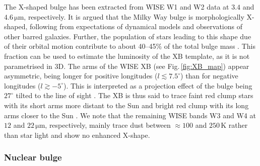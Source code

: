 \documentclass[doublespace,nopageskip]{VTthesis}
\newcommand{\mrm}[1]{\mathrm{#1}}
\begin{document}
The X-shaped bulge \citep[{XB},][]{2016AJ....152...14N} has been extracted from WISE W1 and W2 data at $3.4$ and $4.6\,\mrm{\mu m}$, respectively.
%
It is argued that the Milky Way bulge is morphologically X-shaped, following from expectations of dynamical models and observations of other barred galaxies.
%
Further, the population of stars leading to this shape due of their orbital motion contribute to about 40--45\% of the total bulge mass \citep{2015MNRAS.450L..66P}.
%
This fraction can be used to estimate the luminosity of the {XB} template, as it is not parametrised in 3D.
%
The arms of the WISE {XB} (see Fig.\,\ref{fig:XB_map}) appear asymmetric, being longer for positive longitudes ($l \lesssim 7.5^{\circ}$) than for negative longitudes ($l \gtrsim -5^{\circ}$).
%
This is interpreted as a projection effect of the bulge being $27^{\circ}$ tilted to the line of sight \citep{2013MNRAS.435.1874W}.
%
The {XB} is thus said to trace faint red clump stars with its short arms more distant to the Sun and bright red clump with its long arms closer to the Sun \cite[][cf. discussion about the `double red clump' of the Milky Way]{2018ApJ...862L...8L}.
%
We note that the remaining WISE bands W3 and W4 at $12$ and $22\,\mrm{\mu m}$, respectively, mainly trace dust between $\approx 100$ and $250\,\mrm{K}$ rather than star light and show no enhanced X-shape.


\subsubsection{Nuclear bulge}
\end{document}
